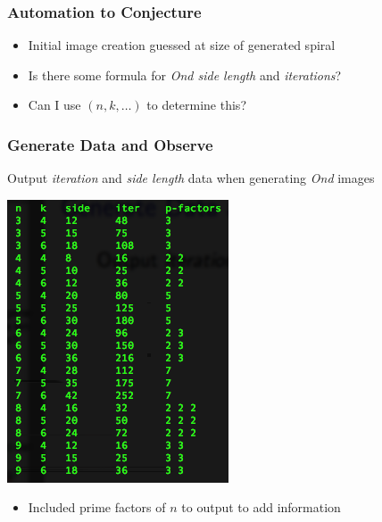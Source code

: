 \documentclass{beamer}
\theoremstyle{mydef}
\begin{document}
\frame
{
  \frametitle{Automation to Conjecture}
  
  \begin{itemize}
  \item Initial image creation guessed at size of generated spiral
  \item Is there some formula for \emph{Ond side length} and \emph{iterations}?
  \item Can I use $(n, k, \ldots)$ to determine this?
  \end{itemize}

}

\frame
{
 \frametitle{Generate Data and Observe}
  Output \emph{iteration} and \emph{side length} data when generating \emph{Ond} images
\begin{center}
\includegraphics[scale=.5]{images/sometab.png}

\end{center}
\begin{itemize}
\item Included prime factors of $n$ to output to add information
\end{itemize}
}
\end{document}
